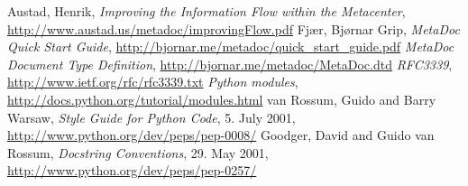 \newpage
\begin{thebibliography}{99}
     Austad, Henrik, \textit{Improving the Information
    Flow within the Metacenter},
    \url{http://www.austad.us/metadoc/improvingFlow.pdf}
     Fjær, Bjørnar Grip, \textit{MetaDoc Quick Start
    Guide}, \url{http://bjornar.me/metadoc/quick_start_guide.pdf}
     \textit{MetaDoc Document Type Definition}, 
        \url{http://bjornar.me/metadoc/MetaDoc.dtd}
     \textit{RFC3339}, \url{http://www.ietf.org/rfc/rfc3339.txt}
     \textit{Python modules},
    \url{http://docs.python.org/tutorial/modules.html}
     van Rossum, Guido and Barry Warsaw, \textit{Style Guide for
    Python Code}, 5. July 2001, \url{http://www.python.org/dev/peps/pep-0008/}
     Goodger, David and Guido van Rossum, \textit{Docstring
    Conventions}, 29. May 2001, \url{http://www.python.org/dev/peps/pep-0257/}
\end{thebibliography}
